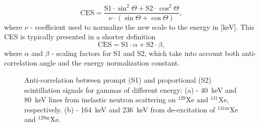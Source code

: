 \begin{equation}
\label{eqCES}
\mathrm{CES} = \frac{\mathrm{S1} \cdot \sin^2{\Theta} + \mathrm{S2} \cdot \cos^2{\Theta}}{\nu \cdot (\sin{\Theta} + \cos{\Theta})},
\end{equation}
where $\nu$ - coefficient used to normalize the new scale to the energy in [keV]. This CES is typically presented in a shorter definition
\begin{equation}
\label{eqCES1}
\mathrm{CES} = \mathrm{S1} \cdot \alpha + \mathrm{S2} \cdot \beta,
\end{equation}
where $\alpha$ and $\beta$ - scaling factors for S1 and S2, which take into account both anti-correlation angle and the energy normalization constant.

\begin{figure}[!h]
\centering
{}
\caption[Anti-correlation between prompt and proportional scintillation signals for gammas of different energy]{Anti-correlation between prompt (S1) and proportional (S2) scintillation signals for gammas of different energy: (a) - 40~keV and 80~keV lines from inelastic neutron scattering on $^{129}$Xe and $^{131}$Xe, respectively. (b) - 164~keV and 236~keV from de-excitation of $^{131\mathrm{m}}$Xe and $^{129\mathrm{m}}$Xe.}
\label{figCES_S2vsS1}
\end{figure}

